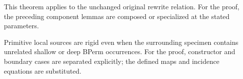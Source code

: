 This theorem applies to the unchanged original rewrite relation.
For the proof, the preceding component lemmas are composed or specialized at the stated parameters.
\par{}

Primitive local sources are rigid even when the surrounding specimen contains unrelated shallow or deep BPerm occurrences.
For the proof, constructor and boundary cases are separated explicitly; the defined maps and incidence equations are substituted.
\par{}

